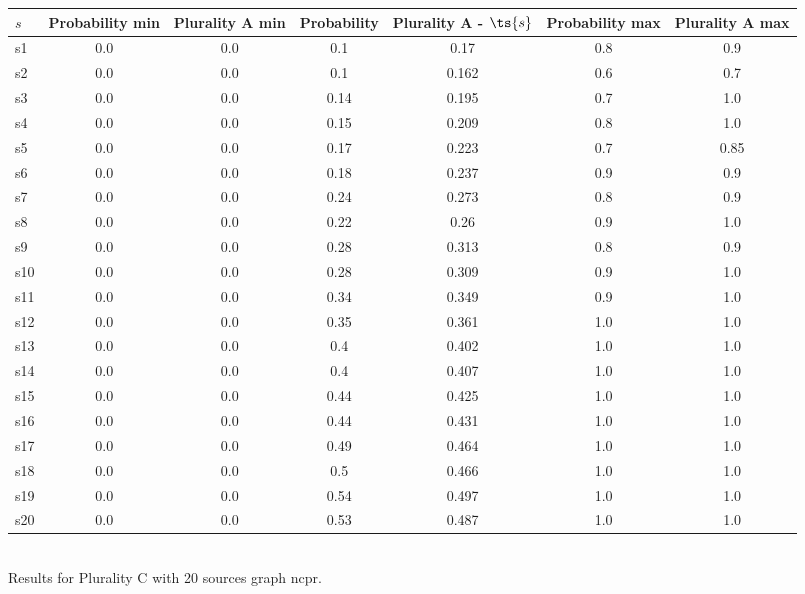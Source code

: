 \documentclass{article}
\begin{document}
\noindent\begin{tabular}{|l|c|c|c|c|c|c|}
\hline
$s$& Probability min & Plurality A min & Probability & Plurality A - $\ts{s}$ & Probability max & Plurality A max\\
\hline
s1 &0.0 & 0.0 & 0.1 & 0.17 & 0.8 & 0.9\\
\hline
s2 &0.0 & 0.0 & 0.1 & 0.162 & 0.6 & 0.7\\
\hline
s3 &0.0 & 0.0 & 0.14 & 0.195 & 0.7 & 1.0\\
\hline
s4 &0.0 & 0.0 & 0.15 & 0.209 & 0.8 & 1.0\\
\hline
s5 &0.0 & 0.0 & 0.17 & 0.223 & 0.7 & 0.85\\
\hline
s6 &0.0 & 0.0 & 0.18 & 0.237 & 0.9 & 0.9\\
\hline
s7 &0.0 & 0.0 & 0.24 & 0.273 & 0.8 & 0.9\\
\hline
s8 &0.0 & 0.0 & 0.22 & 0.26 & 0.9 & 1.0\\
\hline
s9 &0.0 & 0.0 & 0.28 & 0.313 & 0.8 & 0.9\\
\hline
s10 &0.0 & 0.0 & 0.28 & 0.309 & 0.9 & 1.0\\
\hline
s11 &0.0 & 0.0 & 0.34 & 0.349 & 0.9 & 1.0\\
\hline
s12 &0.0 & 0.0 & 0.35 & 0.361 & 1.0 & 1.0\\
\hline
s13 &0.0 & 0.0 & 0.4 & 0.402 & 1.0 & 1.0\\
\hline
s14 &0.0 & 0.0 & 0.4 & 0.407 & 1.0 & 1.0\\
\hline
s15 &0.0 & 0.0 & 0.44 & 0.425 & 1.0 & 1.0\\
\hline
s16 &0.0 & 0.0 & 0.44 & 0.431 & 1.0 & 1.0\\
\hline
s17 &0.0 & 0.0 & 0.49 & 0.464 & 1.0 & 1.0\\
\hline
s18 &0.0 & 0.0 & 0.5 & 0.466 & 1.0 & 1.0\\
\hline
s19 &0.0 & 0.0 & 0.54 & 0.497 & 1.0 & 1.0\\
\hline
s20 &0.0 & 0.0 & 0.53 & 0.487 & 1.0 & 1.0\\
\hline
\end{tabular}\\

\noindent Results for Plurality C with 20 sources graph ncpr.
\end{document}
